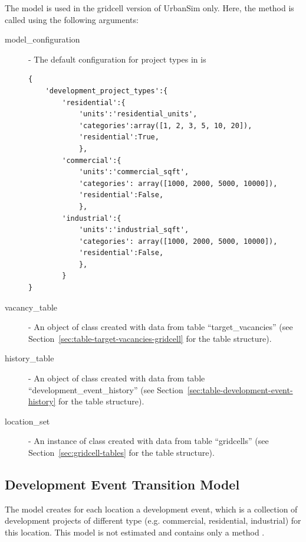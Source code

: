 The model is used in the gridcell version of UrbanSim only. Here,
the method  is called using the
following arguments:
\begin{description}
\item[model_configuration] - The default configuration for project types in
   is \label{page:model-configuration}
\begin{verbatim}
{
    'development_project_types':{
        'residential':{
            'units':'residential_units',
            'categories':array([1, 2, 3, 5, 10, 20]),
            'residential':True,
            },
        'commercial':{
            'units':'commercial_sqft',
            'categories': array([1000, 2000, 5000, 10000]),
            'residential':False,
            },
        'industrial':{
            'units':'industrial_sqft',
            'categories': array([1000, 2000, 5000, 10000]),
            'residential':False,
            },
        }
}
\end{verbatim}
\item[vacancy_table] - An object of class  created
  with data from table ``target_vacancies'' (see
  Section~\ref{sec:table-target-vacancies-gridcell} for the table structure).
\item[history_table] - An object of class  created
  with data from table ``development_event_history'' (see
  Section~\ref{sec:table-development-event-history} for the  table structure).
\item[location_set] - An instance of class  created with
  data from table ``gridcells'' (see Section~\ref{sec:gridcell-tables} for the
  table structure).
\end{description}

%
\subsection{Development Event Transition Model}
%
\label{sec:development-event-transition-model}
%
The model  
creates for each location a development event, which is a collection
of development projects of different type (e.g. commercial, residential,
industrial) for this location. This model is not estimated and contains only a
method .


